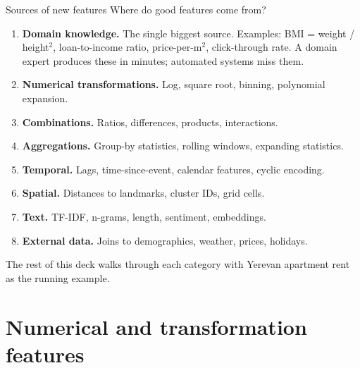\documentclass[aspectratio=169]{beamer}
\begin{document}
\begin{frame}{Sources of new features}
  Where do good features come from?
  \vfill
  \begin{enumerate}
    \item \textbf{Domain knowledge.} The single biggest source. Examples: BMI = weight / height$^2$, loan-to-income ratio, price-per-m$^2$, click-through rate. A domain expert produces these in minutes; automated systems miss them.
    \item \textbf{Numerical transformations.} Log, square root, binning, polynomial expansion.
    \item \textbf{Combinations.} Ratios, differences, products, interactions.
    \item \textbf{Aggregations.} Group-by statistics, rolling windows, expanding statistics.
    \item \textbf{Temporal.} Lags, time-since-event, calendar features, cyclic encoding.
    \item \textbf{Spatial.} Distances to landmarks, cluster IDs, grid cells.
    \item \textbf{Text.} TF-IDF, n-grams, length, sentiment, embeddings.
    \item \textbf{External data.} Joins to demographics, weather, prices, holidays.
  \end{enumerate}
  \vfill
  The rest of this deck walks through each category with Yerevan apartment rent as the running example.
\end{frame}

\section{Numerical and transformation features}
\end{document}

